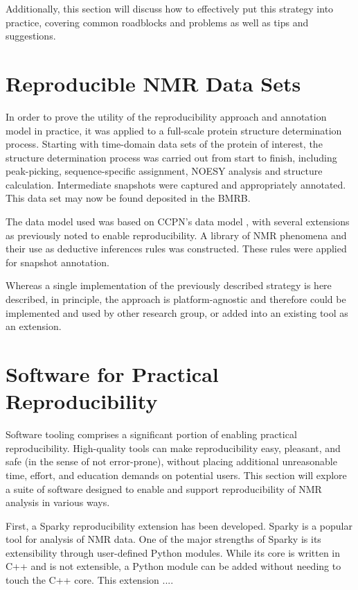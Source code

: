 Additionally, this section will discuss how to effectively put this strategy 
into practice, covering common roadblocks and problems as well as tips and 
suggestions.


\section{Reproducible NMR Data Sets}
In order to prove the utility of the reproducibility approach and annotation 
model in practice, it was applied to a full-scale protein structure 
determination process.  Starting with time-domain data sets of the protein of 
interest, the structure determination process was carried out from start to 
finish, including peak-picking, sequence-specific assignment, NOESY analysis 
and structure calculation.  Intermediate snapshots were captured and 
appropriately annotated.  This data set may now be found deposited in the BMRB.

The data model used was based on CCPN's data model \cite{ccpn}, with several 
extensions as previously noted to enable reproducibility.  A library of NMR 
phenomena and their use as deductive inferences rules was constructed.  
These rules were applied for snapshot annotation.

Whereas a single implementation of the previously described strategy is 
here described, in principle, the approach is platform-agnostic and 
therefore could be implemented and used by other research group, or added 
into an existing tool as an extension.


\section{Software for Practical Reproducibility}
Software tooling comprises a significant portion of enabling practical 
reproducibility.  High-quality tools can make reproducibility easy, pleasant, 
and safe (in the sense of not error-prone), without placing additional 
unreasonable time, effort, and education demands on potential users.  This 
section will explore a suite of software designed to enable and support 
reproducibility of NMR analysis in various ways.
	
First, a Sparky reproducibility extension has been developed.  Sparky 
\cite{sparky} is a popular tool for analysis of NMR data.  One of the major 
strengths of Sparky is its extensibility through user-defined Python modules.  
While its core is written in C++ and is not extensible, a Python module can 
be added without needing to touch the C++ core.  This extension .... %

